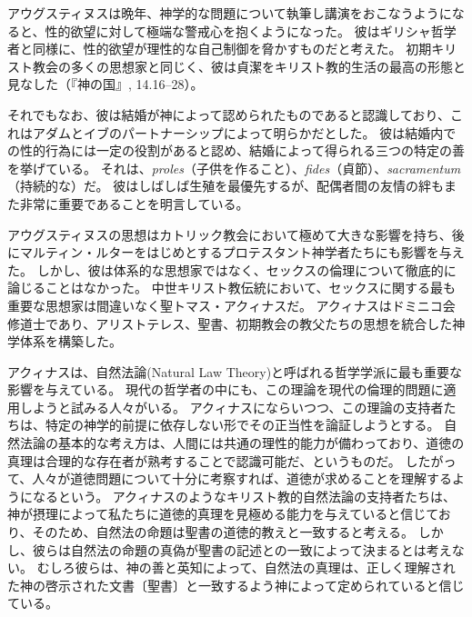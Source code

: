 \documentclass[paper=a4,book,openany]{jlreq}
\begin{document}
アウグスティヌスは晩年、神学的な問題について執筆し講演をおこなうようになると、性的欲望に対して極端な警戒心を抱くようになった。
彼はギリシャ哲学者と同様に、性的欲望が理性的な自己制御を脅かすものだと考えた。
初期キリスト教会の多くの思想家と同じく、彼は貞潔をキリスト教的生活の最高の形態と見なした（『神の国』, 14.16--28）。

\nocite{augustine98:_city_god_pagan}
\nocite{アウグスティヌス82岩波}
\nocite{アウグスティヌス76:告白岩波}

それでもなお、彼は結婚が神によって認められたものであると認識しており、これはアダムとイブのパートナーシップによって明らかだとした。
彼は結婚内での性的行為には一定の役割があると認め、結婚によって得られる三つの特定の善を挙げている。
それは、\emph{proles}（子供を作ること）、\emph{fides}（貞節）、\emph{sacramentum}（持続的な）だ。
彼はしばしば生殖を最優先するが、配偶者間の友情の絆もまた非常に重要であることを明言している\citep{augustine98:_excel_marriag}。

アウグスティヌスの思想はカトリック教会において極めて大きな影響を持ち、後にマルティン・ルターをはじめとするプロテスタント神学者たちにも影響を与えた。
しかし、彼は体系的な思想家ではなく、セックスの倫理について徹底的に論じることはなかった。
中世キリスト教伝統において、セックスに関する最も重要な思想家は間違いなく聖トマス・アクィナスだ。
アクィナスはドミニコ会修道士であり、アリストテレス、聖書、初期教会の教父たちの思想を統合した神学体系を構築した。

アクィナスは、自然法論(Natural Law Theory)と呼ばれる哲学学派に最も重要な影響を与えている。
現代の哲学者の中にも、この理論を現代の倫理的問題に適用しようと試みる人々がいる。
アクィナスにならいつつ、この理論の支持者たちは、特定の神学的前提に依存しない形でその正当性を論証しようとする。
自然法論の基本的な考え方は、人間には共通の理性的能力が備わっており、道徳の真理は合理的な存在者が熟考することで認識可能だ、というものだ。
したがって、人々が道徳問題について十分に考察すれば、道徳が求めることを理解するようになるという。
アクィナスのようなキリスト教的自然法論の支持者たちは、神が摂理によって私たちに道徳的真理を見極める能力を与えていると信じており、そのため、自然法の命題は聖書の道徳的教えと一致すると考える。
しかし、彼らは自然法の命題の真偽が聖書の記述との一致によって決まるとは考えない。
むしろ彼らは、神の善と英知によって、自然法の真理は、正しく理解された神の啓示された文書〔聖書〕と一致するよう神によって定められていると信じている。
\end{document}
